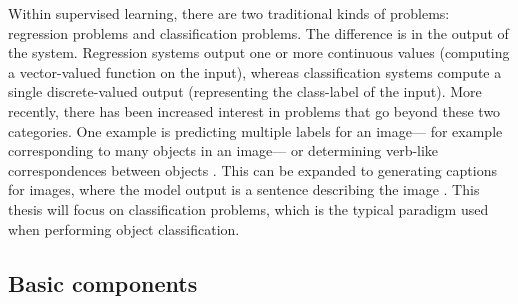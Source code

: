 Within supervised learning, there are two traditional kinds of problems:
regression problems and classification problems.
The difference is in the output of the system.
Regression systems output one or more continuous values
(computing a vector-valued function on the input),
whereas classification systems compute a single discrete-valued output
(representing the class-label of the input).
More recently, there has been increased interest
in problems that go beyond these two categories.
One example is predicting multiple labels for an image---%
for example corresponding to many objects in an image---%
or determining verb-like correspondences between objects \parencite{Karpathy2015}.
This can be expanded to generating captions for images,
where the model output is a sentence describing the image
\parencite{Karpathy2015,Xu2015}.
This thesis will focus on classification problems,
which is the typical paradigm used when performing object classification.


\subsection{Basic components}

